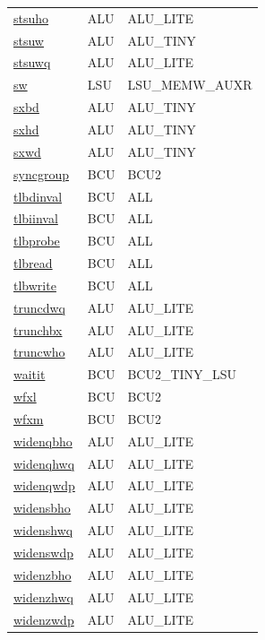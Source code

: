 \begin{small}
\begin{longtable}[l]{l l l}
\hyperlink{lvx.stsuho}{stsuho} & ALU & ALU\_LITE \\ 
\hyperlink{lvx.stsuw}{stsuw} & ALU & ALU\_TINY \\ 
\hyperlink{lvx.stsuwq}{stsuwq} & ALU & ALU\_LITE \\ 
\hyperlink{lvx.sw}{sw} & LSU & LSU\_MEMW\_AUXR \\ 
\hyperlink{lvx.sxbd}{sxbd} & ALU & ALU\_TINY \\ 
\hyperlink{lvx.sxhd}{sxhd} & ALU & ALU\_TINY \\ 
\hyperlink{lvx.sxwd}{sxwd} & ALU & ALU\_TINY \\ 
\hyperlink{lvx.syncgroup}{syncgroup} & BCU & BCU2 \\ 
\hyperlink{lvx.tlbdinval}{tlbdinval} & BCU & ALL \\ 
\hyperlink{lvx.tlbiinval}{tlbiinval} & BCU & ALL \\ 
\hyperlink{lvx.tlbprobe}{tlbprobe} & BCU & ALL \\ 
\hyperlink{lvx.tlbread}{tlbread} & BCU & ALL \\ 
\hyperlink{lvx.tlbwrite}{tlbwrite} & BCU & ALL \\ 
\hyperlink{lvx.truncdwq}{truncdwq} & ALU & ALU\_LITE \\ 
\hyperlink{lvx.trunchbx}{trunchbx} & ALU & ALU\_LITE \\ 
\hyperlink{lvx.truncwho}{truncwho} & ALU & ALU\_LITE \\ 
\hyperlink{lvx.waitit}{waitit} & BCU & BCU2\_TINY\_LSU \\ 
\hyperlink{lvx.wfxl}{wfxl} & BCU & BCU2 \\ 
\hyperlink{lvx.wfxm}{wfxm} & BCU & BCU2 \\ 
\hyperlink{lvx.widenqbho}{widenqbho} & ALU & ALU\_LITE \\ 
\hyperlink{lvx.widenqhwq}{widenqhwq} & ALU & ALU\_LITE \\ 
\hyperlink{lvx.widenqwdp}{widenqwdp} & ALU & ALU\_LITE \\ 
\hyperlink{lvx.widensbho}{widensbho} & ALU & ALU\_LITE \\ 
\hyperlink{lvx.widenshwq}{widenshwq} & ALU & ALU\_LITE \\ 
\hyperlink{lvx.widenswdp}{widenswdp} & ALU & ALU\_LITE \\ 
\hyperlink{lvx.widenzbho}{widenzbho} & ALU & ALU\_LITE \\ 
\hyperlink{lvx.widenzhwq}{widenzhwq} & ALU & ALU\_LITE \\ 
\hyperlink{lvx.widenzwdp}{widenzwdp} & ALU & ALU\_LITE \\ 

\end{longtable}
\end{small}

